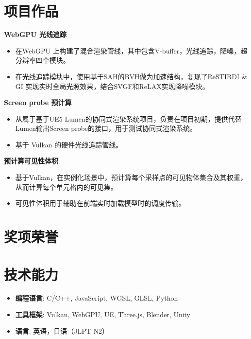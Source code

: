 \documentclass{resume}
\begin{document}
\section{项目作品}

\textbf{WebGPU 光线追踪}
\begin{itemize}
  \item 在WebGPU 上构建了混合渲染管线，其中包含V-buffer，光线追踪，降噪，超分辨率四个模块。
  \item 在光线追踪模块中，使用基于SAH的BVH做为加速结构，复现了ReSTIRDI \& GI 实现实时全局光照效果，结合SVGF和ReLAX实现降噪模块。
\end{itemize}

\textbf{Screen probe 预计算}
\begin{itemize}
  \item 从属于基于UE5 Lumen的协同式渲染系统项目，负责在项目初期，提供代替Lumen输出Screen probe的接口，用于测试协同式渲染系统。
  \item 基于 Vulkan 的硬件光线追踪管线。
\end{itemize}

\textbf{预计算可见性体积}
\begin{itemize}
  \item 基于Vulkan，在实例化场景中，预计算每个采样点的可见物体集合及其权重，从而计算每个单元格内的可见集。
  \item 可见性体积用于辅助在前端实时加载模型时的调度传输。
\end{itemize}

\section{奖项荣誉}
\vspace{12pt}
\section{技术能力}
\begin{itemize}[parsep=0.2ex]
  \item \textbf{编程语言}: C/C++, JavaScript, WGSL, GLSL, Python
  \item \textbf{工具框架}: Vulkan, WebGPU, UE, Three.js, Blender, Unity
  \item \textbf{语言}: 英语，日语（JLPT N2）
\end{itemize}
\end{document}
